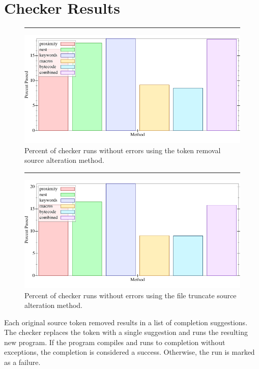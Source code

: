 \documentclass[ms,electronic,twosidetoc,letterpaper,chaptercenter,parttop,lol,lof,lot]{byumsphd}
\begin{document}
\section{Checker Results}

\begin{figure}[h]
\centering
\hrule
\includegraphics[width=1.0\textwidth]{../output/synthesis/checker/Remove-Percent.png}
\caption{Percent of checker runs without errors using the token removal source alteration method.}
\label{fig:checker-remove-percent}
\end{figure}

\begin{figure}[h]
\centering
\hrule
\includegraphics[width=1.0\textwidth]{../output/synthesis/checker/Truncate-Percent.png}
\caption{Percent of checker runs without errors using the file truncate source alteration method.}
\label{fig:checker-truncate-percent}
\end{figure}

Each original source token removed results in a list of completion suggestions.
The checker replaces the token with a single suggestion and runs the resulting new program.
If the program compiles and runs to completion without exceptions, the completion is considered a success.
Otherwise, the run is marked as a failure.
\end{document}
